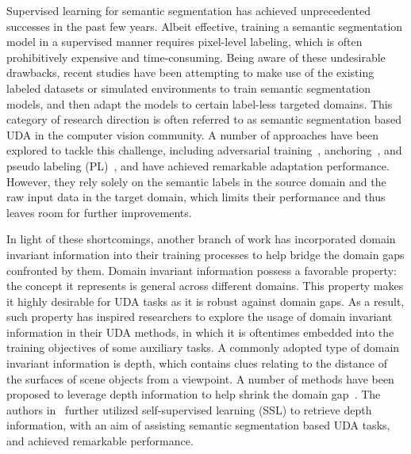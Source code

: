 \documentclass{bmvc2k}
\begin{document}
Supervised learning for semantic segmentation has achieved unprecedented successes in the past few years. Albeit effective, training a semantic segmentation model in a supervised manner requires pixel-level labeling, which is often prohibitively expensive and time-consuming. Being aware of these undesirable drawbacks, recent studies have been attempting to make use of the existing labeled datasets or simulated environments to train semantic segmentation models, and then adapt the models to certain label-less targeted domains. This category of research direction is often referred to as semantic segmentation based UDA in the computer vision community. A number of approaches have been explored to tackle this challenge, including adversarial training~\cite{vu2019advent,tsai2019domain,xu2019adversarial,wu2020dual}, anchoring~\cite{zhang2019category,zhang2021prototypical,ma2021coarsetofine,ning2021multianchor}, and pseudo labeling (PL)~\cite{zou2018domain,zou2020confidence,mei2020instance,tranheden2020dacs}, and have achieved remarkable adaptation performance. However, they rely solely on the semantic labels in the source domain and the raw input data in the target domain, which limits their performance and thus leaves room for further improvements.




In light of these shortcomings, another branch of work has incorporated domain invariant information into their training processes to help bridge the domain gaps confronted by them. Domain invariant information possess a favorable property: the concept it represents is general across different domains.
This property makes it highly desirable for UDA tasks as it is robust against domain gaps. As a result, such property has inspired researchers to explore the usage of domain invariant information in their UDA methods, in which it is oftentimes embedded into the training objectives of some auxiliary tasks. A commonly adopted type of domain invariant information is depth, which contains clues relating to the distance of the surfaces of scene objects from a viewpoint. A number of methods have been proposed to leverage depth information to help shrink the domain gap~\cite{vu2019dada,Lee2019SPIGANPA,Chen_2019_GIOada,Saha_2021_CVPR_CTRL}. The authors in~\cite{wang2021domain} further utilized self-supervised learning (SSL) to retrieve depth information, with an aim of assisting semantic segmentation based UDA tasks, and achieved remarkable performance. 
\end{document}
